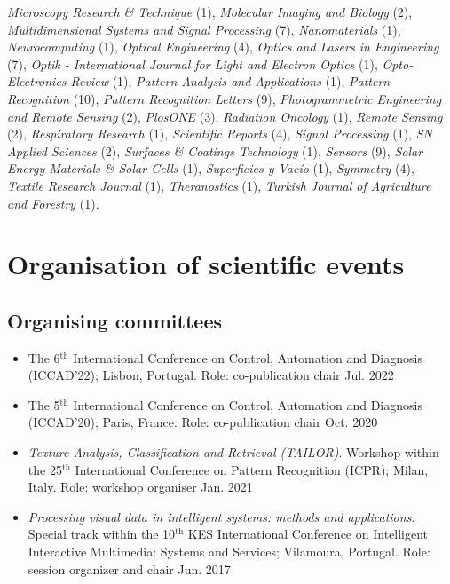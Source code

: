 \documentclass[11pt]{article}
\begin{document}
\begin{itemize}
    \emph{Microscopy Research \& Technique} (1),
    \emph{Molecular Imaging and Biology} (2),
    \emph{Multidimensional Systems and Signal Processing} (7),
    \emph{Nanomaterials} (1),
    \emph{Neurocomputing} (1),
    \emph{Optical Engineering} (4),
    \emph{Optics and Lasers in Engineering} (7),
    \emph{Optik - International Journal for Light and Electron Optics} (1),
    \emph{Opto-Electronics Review} (1),
    \emph{Pattern Analysis and Applications} (1),
    \emph{Pattern Recognition} (10),
    \emph{Pattern Recognition Letters} (9),
    \emph{Photogrammetric Engineering and Remote Sensing} (2),
    \emph{PlosONE} (3),
    \emph{Radiation Oncology} (1),
    \emph{Remote Sensing} (2),
    \emph{Respiratory Research} (1),
    \emph{Scientific Reports} (4),
    \emph{Signal Processing} (1),
    \emph{SN Applied Sciences} (2),
    \emph{Surfaces \& Coatings Technology} (1),
    \emph{Sensors} (9),
    \emph{Solar Energy Materials \& Solar Cells} (1),
    \emph{Superficies y Vacío} (1),
    \emph{Symmetry} (4),
    \emph{Textile Research Journal} (1),
    \emph{Theranostics} (1),
    \emph{Turkish Journal of Agriculture and Forestry} (1).
\end{itemize}

\section*{Organisation of scientific events}

\subsection*{Organising committees}

\begin{itemize} 

	\item The 6$^\text{th}$ International Conference on Control, Automation and Diagnosis (ICCAD'22); Lisbon, Portugal. Role: co-publication chair \hfill Jul. 2022

	\item The 5$^\text{th}$ International Conference on Control, Automation and Diagnosis (ICCAD'20); Paris, France. Role: co-publication chair \hfill Oct. 2020 

	\item \emph{Texture Analysis, Classification and Retrieval (TAILOR)}. Workshop within the 25$^\text{th}$ International Conference on Pattern Recognition (ICPR); Milan, Italy. Role: workshop organiser \hfill Jan. 2021

	\item \emph{Processing visual data in intelligent systems: methods and applications}. Special track within the 10$^\text{th}$ KES International Conference on Intelligent Interactive Multimedia: Systems and Services; Vilamoura, Portugal. Role: session organizer and chair \hfill Jun. 2017

\end{itemize}	
\end{document}
